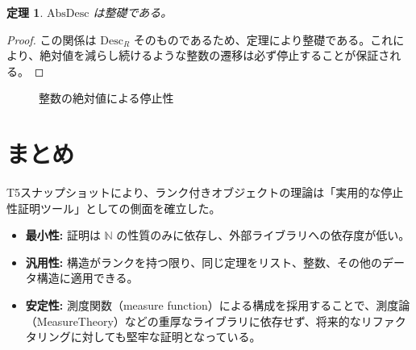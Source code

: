 \documentclass[a4paper,11pt]{article}
\theoremstyle{definition}
\theoremstyle{plain}
\newtheorem{theorem}[definition]{定理}
\newcommand{\Desc}{\mathrm{Desc}}
\newcommand{\N}{\mathbb{N}}
\newcommand{\Z}{\mathbb{Z}}
\begin{document}
\begin{theorem}
$\mathrm{AbsDesc}$ は整礎である。
\end{theorem}
\begin{proof}
この関係は $\Desc_R$ そのものであるため、定理により整礎である。これにより、絶対値を減らし続けるような整数の遷移は必ず停止することが保証される。
\end{proof}

\begin{figure}[h]
\centering
{}
\caption{整数の絶対値による停止性}
\end{figure}

\section{まとめ}

T5スナップショットにより、ランク付きオブジェクトの理論は「実用的な停止性証明ツール」としての側面を確立した。
\begin{itemize}
    \item \textbf{最小性:} 証明は $\N$ の性質のみに依存し、外部ライブラリへの依存度が低い。
    \item \textbf{汎用性:} 構造がランクを持つ限り、同じ定理をリスト、整数、その他のデータ構造に適用できる。
    \item \textbf{安定性:} 測度関数（measure function）による構成を採用することで、測度論（MeasureTheory）などの重厚なライブラリに依存せず、将来的なリファクタリングに対しても堅牢な証明となっている。
\end{itemize}
\end{document}
